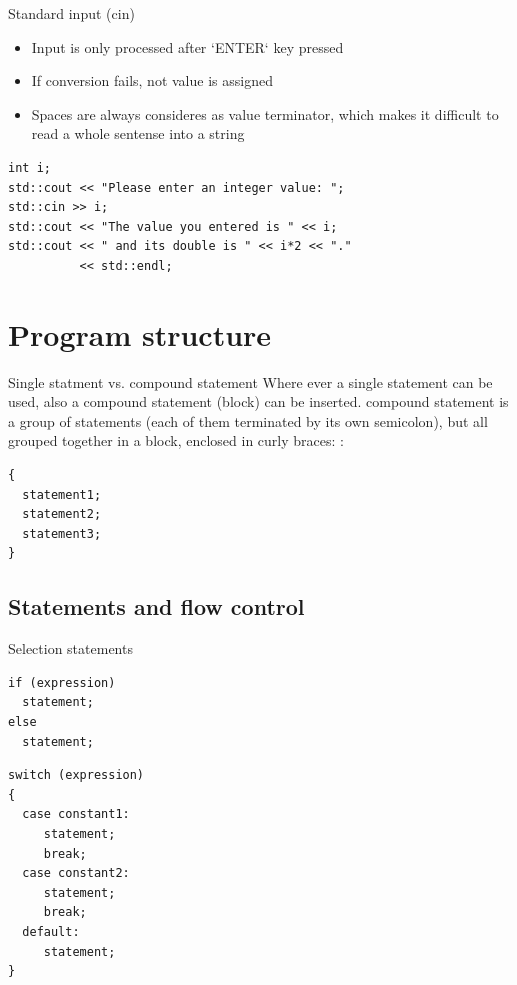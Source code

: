 \documentclass{beamer}
\begin{document}
\begin{frame}[fragile]{Standard input (cin)}
\begin{itemize}
\item Input is only processed after `ENTER` key pressed
\item If conversion fails, not value is assigned
\item Spaces are always consideres as value terminator, which makes it difficult
to read a whole sentense into a string
\end{itemize}

\begin{lstlisting}[caption=Standard input]
int i;
std::cout << "Please enter an integer value: ";
std::cin >> i;
std::cout << "The value you entered is " << i;
std::cout << " and its double is " << i*2 << "." 
          << std::endl;
\end{lstlisting}
\end{frame}


\section{Program structure}

\begin{frame}[fragile]{Single statment vs. compound statement}
Where ever a single statement can be used, also a compound statement (block) can
be inserted.  compound statement is a group of statements (each of them
terminated by its own semicolon), but all grouped together in a block, enclosed 
in curly braces: {}:
\begin{lstlisting}[caption=Compound statement]
{ 
  statement1; 
  statement2; 
  statement3;
}
\end{lstlisting}
\end{frame}


\subsection{Statements and flow control}
\begin{frame}[fragile]{Selection statements}
\begin{lstlisting}[caption=If and else]
if (expression)
  statement;
else
  statement;
\end{lstlisting}

\begin{lstlisting}[caption=Switch]
switch (expression)
{
  case constant1:
     statement;
     break;
  case constant2:
     statement;
     break;
  default:
     statement;
}
\end{lstlisting}

\end{frame}
\end{document}
